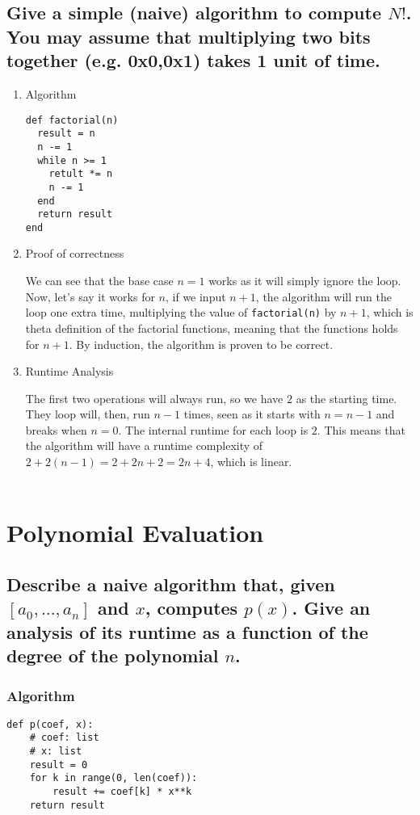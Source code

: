 \documentclass[11pt]{article}
\begin{document}
\subsection{Give a simple (naive) algorithm to compute \(N!\). You may assume that multiplying two bits together (e.g.  0x0,0x1) takes 1 unit of time.}
\label{sec:org9644d27}
\begin{enumerate}
\item Algorithm
\label{sec:org0dbfbfe}

\begin{verbatim}
def factorial(n)
  result = n
  n -= 1
  while n >= 1
    retult *= n
    n -= 1
  end
  return result
end
\end{verbatim}
\item Proof of correctness
\label{sec:org2ce2e5f}

We can see that the base case \(n = 1\) works as it will simply ignore the loop. Now, let's say it works for \(n\), if we input \(n+1\), the algorithm will run the loop one extra time, multiplying the value of \texttt{factorial(n)} by \(n+1\), which is theta definition of the factorial functions, meaning that the functions holds for \(n+1\). By induction, the algorithm is proven to be correct.\\
\item Runtime Analysis
\label{sec:org5007da3}

The first two operations will always run, so we have \(2\) as the starting time. They loop will, then, run \(n-1\) times, seen as it starts with \(n = n - 1\) and breaks when \(n = 0\). The internal runtime for each loop is \(2\). This means that the algorithm will have a runtime complexity of \(2 + 2(n-1) = 2 + 2n + 2 = 2n + 4\), which is linear.\\

\newpage\\
\end{enumerate}
\section{Polynomial Evaluation}
\label{sec:orgf093572}
\subsection{Describe a naive algorithm that, given \([a_{0},...,a_{n}]\) and \(x\), computes \(p(x)\). Give an analysis of its runtime as a function of the degree of the polynomial \(n\).}
\label{sec:orgc4191fc}
\subsubsection{Algorithm}
\label{sec:org879e2fc}
\begin{verbatim}
def p(coef, x):
    # coef: list
    # x: list
    result = 0
    for k in range(0, len(coef)):
        result += coef[k] * x**k
    return result
\end{verbatim}
\end{document}
